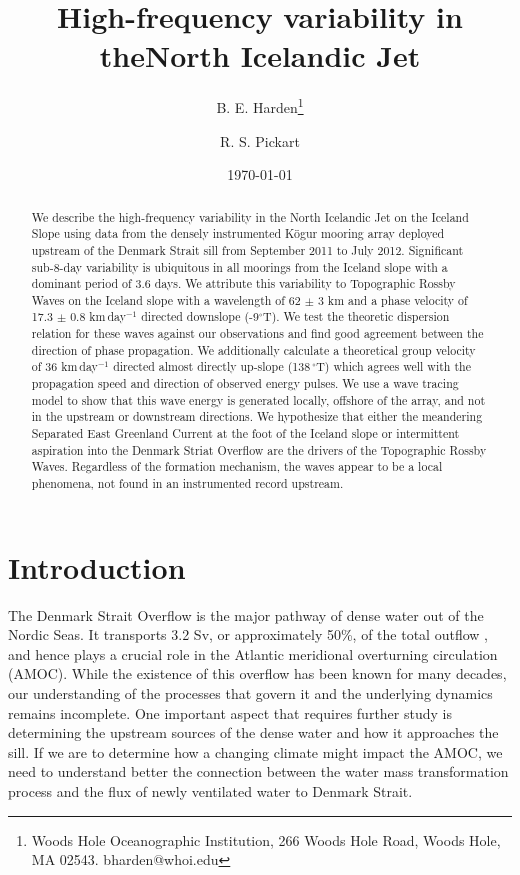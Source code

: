 \documentclass[12pt,titlepage,figuresatend]{article}
\title{High-frequency variability in the\authorcr North Icelandic Jet}
\author{B. E. Harden\footnote{Woods Hole Oceanographic Institution, 266 Woods Hole Road, Woods Hole, MA 02543. bharden@whoi.edu}}
\author{R. S. Pickart}
\affil{Woods Hole Oceanographic Institution, Woods Hole, USA}
\date{\today}
\begin{document}
\maketitle

\begin{abstract}
We describe the high-frequency variability in the North Icelandic Jet on the Iceland Slope using data from the densely instrumented K\"{o}gur mooring array deployed upstream of the Denmark Strait sill from September 2011 to July 2012. Significant sub-8-day variability is ubiquitous in all moorings from the Iceland slope with a dominant period of 3.6 days. We attribute this variability to Topographic Rossby Waves on the Iceland slope with a wavelength of 62 $\pm$ 3 km and a phase velocity of 17.3 $\pm$ 0.8 km$\,$day$^{-1}$ directed downslope (-9$^{\circ}$T). We test the theoretic dispersion relation for these waves against our observations and find good agreement between the direction of phase propagation. We additionally calculate a theoretical group velocity of 36 km$\,$day$^{-1}$ directed almost directly up-slope (138$\,^{\circ}$T) which agrees well with the propagation speed and direction of observed energy pulses. We use a wave tracing model to show that this wave energy is generated locally, offshore of the array, and not in the upstream or downstream directions. We hypothesize that either the meandering Separated East Greenland Current at the foot of the Iceland slope or intermittent aspiration into the Denmark Striat Overflow are the drivers of the Topographic Rossby Waves. Regardless of the formation mechanism, the waves appear to be a local phenomena, not found in an instrumented record upstream.

\end{abstract}

\section{Introduction}

The Denmark Strait Overflow is the major pathway of dense water out of the Nordic Seas. It transports 3.2 Sv, or approximately 50\%, of the total outflow \cite[]{Dickson1994,Jochumsen2017}, and hence plays a crucial role in the Atlantic meridional overturning circulation (AMOC). While the existence of this overflow has been known for many decades, our understanding of the processes that govern it and the underlying dynamics remains incomplete. One important aspect that requires further study is determining the upstream sources of the dense water and how it approaches the sill. If we are to determine how a changing climate might impact the AMOC, we need to understand better the connection between the water mass transformation process and the flux of newly ventilated water to Denmark Strait. 
\end{document}
